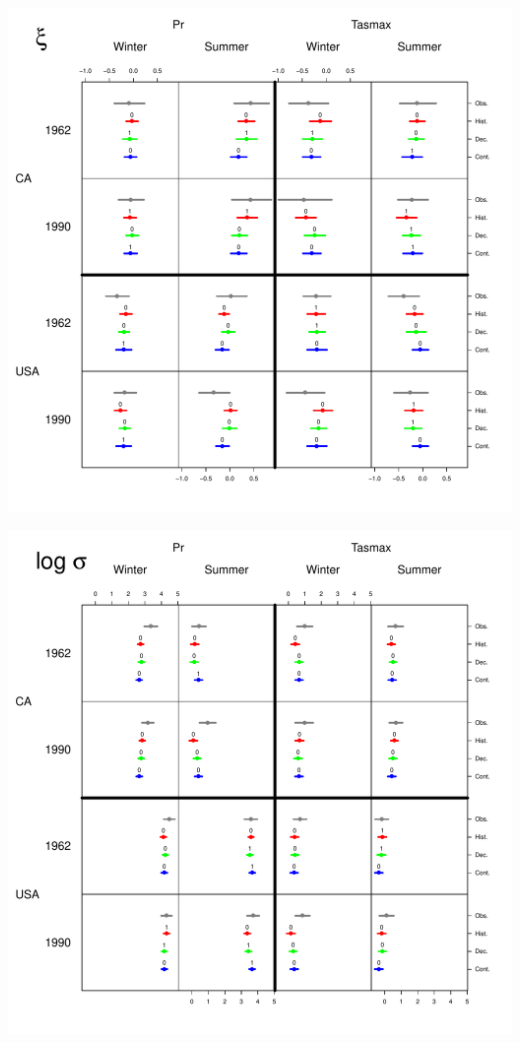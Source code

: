 \documentclass[mathserif, 11pt, t]{beamer}
\begin{document}
\begin{frame}
\begin{center}
\includegraphics[scale=0.34]{figs/shape.pdf}
\end{center}
\end{frame}

\begin{frame}
\begin{center}
\includegraphics[scale=0.34]{figs/log_sigma.pdf}
\end{center}
\end{frame}
\end{document}
